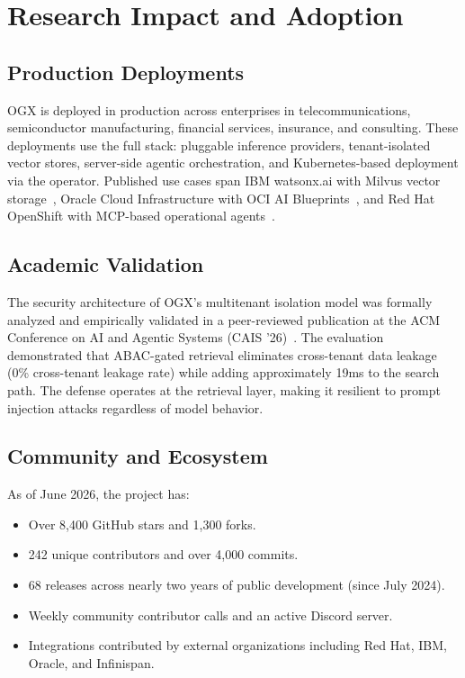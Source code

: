 \documentclass[11pt]{article}
\begin{document}
\section{Research Impact and Adoption}
\label{sec:impact}

\subsection{Production Deployments}

OGX is deployed in production across enterprises in telecommunications, semiconductor manufacturing, financial services, insurance, and consulting. These deployments use the full stack: pluggable inference providers, tenant-isolated vector stores, server-side agentic orchestration, and Kubernetes-based deployment via the operator. Published use cases span IBM watsonx.ai with Milvus vector storage~\cite{ibm_rag_milvus}, Oracle Cloud Infrastructure with OCI AI Blueprints~\cite{oracle_oci_ogx}, and Red Hat OpenShift with MCP-based operational agents~\cite{redhat_ops_agent}.

\subsection{Academic Validation}

The security architecture of OGX's multitenant isolation model was formally analyzed and empirically validated in a peer-reviewed publication at the ACM Conference on AI and Agentic Systems (CAIS '26)~\cite{arceo2026securing}. The evaluation demonstrated that ABAC-gated retrieval eliminates cross-tenant data leakage (0\% cross-tenant leakage rate) while adding approximately 19ms to the search path. The defense operates at the retrieval layer, making it resilient to prompt injection attacks regardless of model behavior.

\subsection{Community and Ecosystem}

As of June 2026, the project has:
\begin{itemize}[nosep]
  \item Over 8,400 GitHub stars and 1,300 forks.
  \item 242 unique contributors and over 4,000 commits.
  \item 68 releases across nearly two years of public development (since July 2024).
  \item Weekly community contributor calls and an active Discord server.
  \item Integrations contributed by external organizations including Red Hat, IBM, Oracle, and Infinispan.
\end{itemize}
\end{document}
